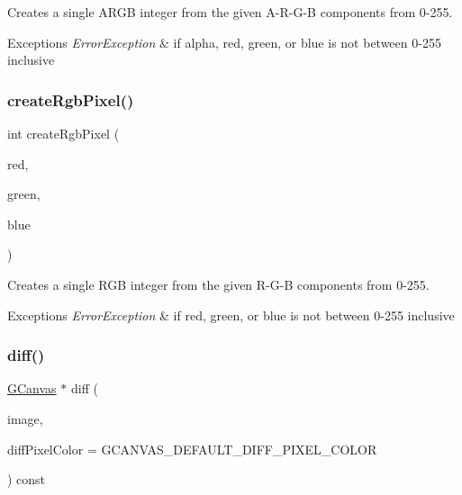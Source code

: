 Creates a single A\+R\+GB integer from the given A-\/\+R-\/\+G-\/B components from 0-\/255. 


\begin{DoxyExceptions}{Exceptions}
{\em Error\+Exception} & if alpha, red, green, or blue is not between 0-\/255 inclusive \\
\hline
\end{DoxyExceptions}
\mbox{\label{classGCanvas_a10beefcf8631433d0cdddefd4e24c76a}} 
\subsubsection{\texorpdfstring{create\+Rgb\+Pixel()}{createRgbPixel()}}
{\footnotesize\ttfamily int create\+Rgb\+Pixel (\begin{DoxyParamCaption}\item[{int}]{red,  }\item[{int}]{green,  }\item[{int}]{blue }\end{DoxyParamCaption})\hspace{0.3cm}{\ttfamily [static]}}



Creates a single R\+GB integer from the given R-\/\+G-\/B components from 0-\/255. 


\begin{DoxyExceptions}{Exceptions}
{\em Error\+Exception} & if red, green, or blue is not between 0-\/255 inclusive \\
\hline
\end{DoxyExceptions}
\mbox{\label{classGCanvas_aa4e74e40eebb70c9616065056de5c4ca}} 
\subsubsection{\texorpdfstring{diff()}{diff()}\hspace{0.1cm}{\footnotesize\ttfamily [1/2]}}
{\footnotesize\ttfamily \mbox{\hyperlink{classGCanvas}{G\+Canvas}} $\ast$ diff (\begin{DoxyParamCaption}\item[{const \mbox{\hyperlink{classGCanvas}{G\+Canvas}} \&}]{image,  }\item[{int}]{diff\+Pixel\+Color = {\ttfamily GCANVAS\+\_\+DEFAULT\+\_\+DIFF\+\_\+PIXEL\+\_\+COLOR} }\end{DoxyParamCaption}) const\hspace{0.3cm}{\ttfamily [virtual]}}



